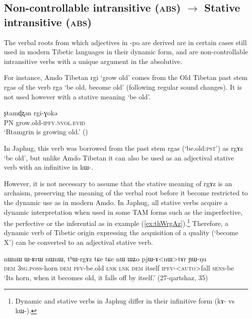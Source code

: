\documentclass[oldfontcommands,oneside,a4paper,11pt]{article}
\newcommand{\ipa}[1]{{\phon \mbox{#1}}} %
\newcommand{\refb}[1]{(\ref{#1})}
\begin{document}
  
\subsection{Non-controllable intransitive (\textsc{abs}) $\rightarrow$ Stative intransitive (\textsc{abs})}
The verbal roots from which adjectives in \ipa{-po} are derived are in certain cases still used in modern Tibetic languages in their dynamic form, and are non-controllable intransitive verbs with a unique argument in the absolutive.

For instance, Amdo Tibetan \ipa{rgi} `grow old' comes from the Old Tibetan past stem \ipa{rgas} of the verb \ipa{rga} `be old, become old' (following regular sound changes). It is not used however with a stative meaning `be old'.

\begin{exe}
\ex \label{ex:rgi}
\gll
\ipa{ʂtamɖʐən} 	\ipa{rgi-ɣokə}  	 \\
PN grow.old-\textsc{ipfv.nvol.evid} \\
\glt `Rtamgrin is growing old.' (\citealt[123, ex. 548]{haller04themchen})
\end{exe}

In Japhug, this verb was borrowed from the past stem \ipa{rgas} (`be.old:\textsc{pst}') as \ipa{rgɤz} `be old', but unlike Amdo Tibetan it can also be used as an adjectival stative verb with an infinitive in \ipa{kɯ-}. 

However, it is not necessary to assume that the stative meaning of \ipa{rgɤz} is an archaism, preserving the meaning of the verbal root before it become restricted to the dynamic use as in modern Amdo. In Japhug, all stative verbs acquire a dynamic interpretation when used in some TAM forms such as the imperfective, the perfective or the inferential as in example \refb{ex:thWrgAz}.\footnote{Dynamic and stative verbs in Japhug differ in their infinitive form (\ipa{kɤ-} vs \ipa{kɯ-}). } Therefore, a dynamic verb of Tibetic origin expressing the acquisition of a quality (`become X') can be converted to an adjectival stative verb.

\begin{exe}
\ex \label{ex:thWrgAz}
\gll
\ipa{nɯnɯ}  	\ipa{ɯ-ʁrɯ}  	\ipa{nɯnɯ,}  	\ipa{tʰɯ-rgɤz}  	\ipa{tɕe}  	\ipa{tɕe}  	\ipa{nɯ}  	\ipa{ɯʑo}  	\ipa{pjɯ-ɤ<nɯ>tɤr}  	\ipa{ɲɯ-ŋu}  \\
\textsc{dem} \textsc{3sg.poss}-horn \textsc{dem} \textsc{pfv}-be.old \textsc{lnk}  \textsc{lnk} \textsc{dem} itself \textsc{ipfv}-<\textsc{auto}>fall \textsc{sens}-be \\
\glt `Its horn, when it becomes old, it falls off by itself.' (27-qartshaz, 35)
\end{exe}
\end{document}
